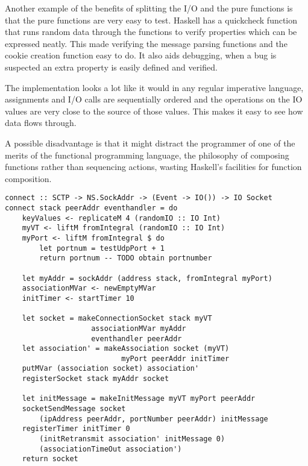 Another example of the benefits of splitting the I/O and the pure functions is that the pure functions are very easy to test. Haskell has a quickcheck\cite{Claessen_2000} function that runs random data through the functions to verify properties which can be expressed neatly. This made verifying the message parsing functions and the cookie creation function easy to do. It also aids debugging, when a bug is suspected an extra property is easily defined and verified.


The implementation looks a lot like it would in any regular imperative language, assignments and I/O calls are sequentially ordered and the operations on the IO values are very close to the source of those values. This makes it easy to see how data flows through.

A possible disadvantage is that it might distract the programmer of one of the merits of the functional programming language, the philosophy of composing functions rather than sequencing actions, wasting Haskell's facilities for function composition. 

\begin{lstlisting}[caption={The connect function looks imperative}]
connect :: SCTP -> NS.SockAddr -> (Event -> IO()) -> IO Socket
connect stack peerAddr eventhandler = do
    keyValues <- replicateM 4 (randomIO :: IO Int)
    myVT <- liftM fromIntegral (randomIO :: IO Int)
    myPort <- liftM fromIntegral $ do 
        let portnum = testUdpPort + 1
        return portnum -- TODO obtain portnumber

    let myAddr = sockAddr (address stack, fromIntegral myPort)
    associationMVar <- newEmptyMVar
    initTimer <- startTimer 10

    let socket = makeConnectionSocket stack myVT
                    associationMVar myAddr
                    eventhandler peerAddr
    let association' = makeAssociation socket (myVT) 
                           myPort peerAddr initTimer
    putMVar (association socket) association'
    registerSocket stack myAddr socket

    let initMessage = makeInitMessage myVT myPort peerAddr
    socketSendMessage socket 
        (ipAddress peerAddr, portNumber peerAddr) initMessage
    registerTimer initTimer 0 
        (initRetransmit association' initMessage 0)
        (associationTimeOut association')
    return socket
\end{lstlisting}

